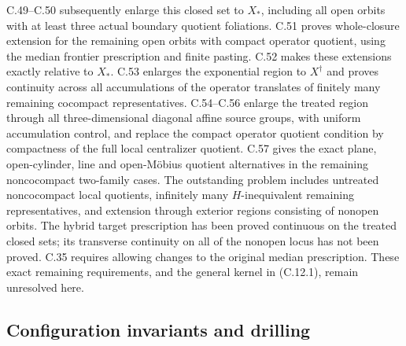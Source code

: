 C.49--C.50 subsequently enlarge this closed set to $X_*$,
including all open orbits with at least three actual boundary
quotient foliations. C.51 proves whole-closure extension for
the remaining open orbits with compact operator quotient,
using the median frontier prescription and finite pasting.
C.52 makes these extensions exactly relative to $X_*$.
C.53 enlarges the exponential region to $X^\dagger$ and
proves continuity across all accumulations of the operator
translates of finitely many remaining cocompact representatives.
C.54--C.56 enlarge the treated region through all
three-dimensional diagonal affine source groups, with
uniform accumulation control, and replace the compact
operator quotient condition by compactness of the full
local centralizer quotient. C.57 gives the exact plane,
open-cylinder, line and open-M\"obius quotient alternatives
in the remaining noncocompact two-family cases.
The outstanding problem includes untreated noncocompact local
quotients, infinitely many $H$-inequivalent remaining
representatives, and extension through exterior regions
consisting of nonopen orbits. The hybrid target prescription
has been proved continuous on the treated closed sets;
its transverse continuity on all of the nonopen locus has
not been proved. C.35 requires allowing changes to the
original median prescription. These exact remaining
requirements, and the general kernel in (C.12.1), remain
unresolved here.


\subsection{Configuration invariants and drilling}

